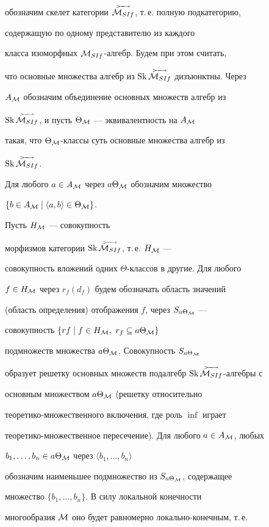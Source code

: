 обозначим скелет категории $\GAR{\M_{SIf}}$, т.\,е. полную подкатегорию,


содержащую по одному представителю из каждого


класса изоморфных ${\cal M}_{SIf}$-алгебр. Будем при этом считать,


что основные множества алгебр из $\Sk \GAR{\M_{SIf}}$ дизъюнктны. Через


$A_{{\cal M}}$ обозначим объединение основных множеств алгебр из


$\Sk \GAR{\M_{SIf}}$, и пусть $\Theta_{{\cal M}}$ --- эквивалентность на $A_{{\cal M}}$


такая, что $\Theta_{{\cal M}}$-классы суть основные множества алгебр из


$\Sk \GAR{\M_{SIf}}$.





Для любого $a\in A_{{\cal M}}$ через $a\Theta_{{\cal M}}$ обозначим множество


$\{b\in A_{{\cal M}}\mid\langle a,b\rangle\in\Theta_{{\cal M}}\}$.


Пусть $H_{{\cal M}}$ --- совокупность


морфизмов категории $\Sk \GAR{\M_{SIf}}$, т.\,е. $H_{{\cal M}}$ ---


совокупность вложений одних $\Theta$-классов в другие. Для любого


$f\in H_{{\cal M}}$ через $r_f(d_f)$ будем обозначать область значений


(область определения) отображения $f$, через $S_{a\Theta_{{\cal M}}}$ ---


совокупность $\{rf\mid f\in H_{\M},\ r_f\subseteq a\Theta_{\M}\}$


подмножеств множества $a\Theta_{{\cal M}}$. Совокупность $S_{a\Theta_{{\cal M}}}$


образует решетку основных множеств подалгебр $\Sk \GAR{\M_{SIf}}$-алгебры с


основным множеством $a\Theta_{{\cal M}}$ (решетку относительно


теоретико-множественного включения, где роль $\inf$ играет


теоретико-множественное пересечение). Для любого $a\in A_{{\cal M}}$, любых


$b_1,\dotsc,b_n\in a\Theta_{{\cal M}}$ через $\langle b_1,\dotsc,b_n\rangle$


обозначим наименьшее подмножество из $S_{a\Theta_{{\cal M}}}$, содержащее


множество $\{b_1,\dotsc,b_n\}$. В силу локальной конечности


многообразия ${\cal M}$ оно будет равномерно локально-конечным, т.\,е.


